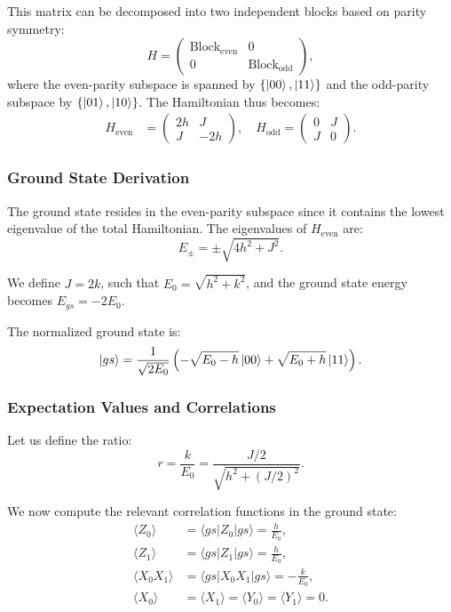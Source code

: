 This matrix can be decomposed into two independent blocks based on parity symmetry:
\[
H =
\begin{pmatrix}
\text{Block}_{\text{even}} & 0 \\
0 & \text{Block}_{\text{odd}}
\end{pmatrix},
\]
where the even-parity subspace is spanned by \( \{\ket{00}, \ket{11}\} \) and the odd-parity subspace by \( \{\ket{01}, \ket{10}\} \). The Hamiltonian thus becomes:
\begin{align}
H_{\text{even}} &= 
\begin{pmatrix}
2h & J \\
J & -2h
\end{pmatrix}, \quad
H_{\text{odd}} = 
\begin{pmatrix}
0 & J \\
J & 0
\end{pmatrix}.
\end{align}

\subsubsection{Ground State Derivation}

The ground state resides in the even-parity subspace since it contains the lowest eigenvalue of the total Hamiltonian. The eigenvalues of \( H_{\text{even}} \) are:
\begin{equation}
E_{\pm} = \pm \sqrt{4h^2 + J^2}.
\end{equation}

We define \( J = 2k \), such that \( E_0 = \sqrt{h^2 + k^2} \), and the ground state energy becomes \( E_{gs} = -2E_0 \).

The normalized ground state is:
\begin{equation}
\ket{gs} = \frac{1}{\sqrt{2E_0}} \left( -\sqrt{E_0 - h} \ket{00} + \sqrt{E_0 + h} \ket{11} \right).
\end{equation}

\subsubsection{Expectation Values and Correlations}

Let us define the ratio:
\begin{equation}
r = \frac{k}{E_0} = \frac{J/2}{\sqrt{h^2 + (J/2)^2}}.
\end{equation}

We now compute the relevant correlation functions in the ground state:
\begin{align}
\langle Z_0 \rangle &= \langle gs | Z_0 | gs \rangle = \frac{h}{E_0}, \\
\langle Z_1 \rangle &= \langle gs | Z_1 | gs \rangle = \frac{h}{E_0}, \\
\langle X_0 X_1 \rangle &= \langle gs | X_0 X_1 | gs \rangle = -\frac{k}{E_0}, \\
\langle X_0 \rangle &= \langle X_1 \rangle = \langle Y_0 \rangle = \langle Y_1 \rangle = 0.
\end{align}

